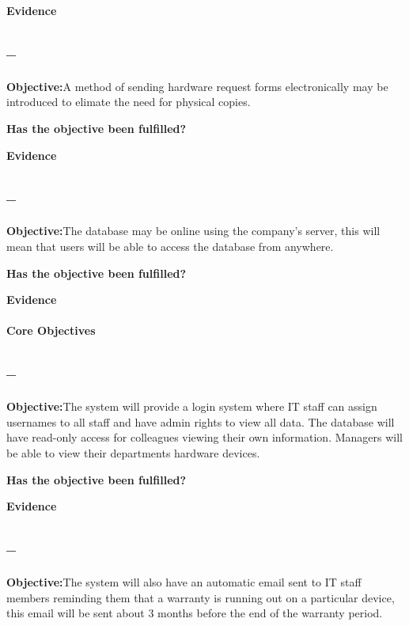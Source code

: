 \textbf{Evidence}



\subsection{--}

\textbf{Objective:}A method of sending hardware request forms electronically may be introduced to elimate the need for physical copies.

\textbf{Has the objective been fulfilled?}

\textbf{Evidence}


\subsection{--}

\textbf{Objective:}The database may be online using the company's server, this will mean that users will be able to access the database from anywhere.

\textbf{Has the objective been fulfilled?}

\textbf{Evidence}


\paragraph{Core Objectives}

\subsection{--}

\textbf{Objective:}The system will provide a login system where IT staff can assign usernames to all staff and have admin rights to view all data. The database will have read-only access for colleagues viewing their own information. Managers will be able to view their departments hardware devices.

\textbf{Has the objective been fulfilled?}

\textbf{Evidence}

\subsection{--}

\textbf{Objective:}The system will also have an automatic email sent to IT staff members reminding them that a warranty is running out on a particular device, this email will be sent about 3 months before the end of the warranty period.

